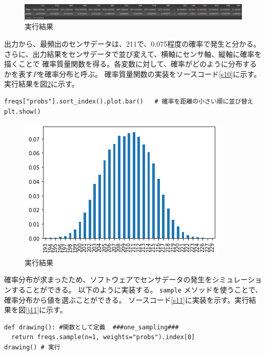 \begin{figure}[htbp]
  \begin{center}
  \includegraphics[width=\linewidth]{img/9.png}
  \caption{実行結果}
  \label{j9}
  \end{center}
\end{figure}

出力から、最頻出のセンサデータは、211で、0.075程度の確率で発生と分かる。
さらに、出力結果をセンサデータで並び変えて、横軸にセンサ軸、縦軸に確率を描くことで
確率質量関数を得る。各変数に対して、確率がどのように分布するかを表す$P$を確率分布と呼ぶ。
確率質量関数の実装をソースコード\ref{s10}\cite{robo}に示す。実行結果を図\ref{j10}に示す。

\begin{lstlisting}[caption=センサデータの並び替え,label=s10]
freqs["probs"].sort_index().plot.bar()   # 確率を距離の小さい順に並び替え
plt.show()
\end{lstlisting}

\begin{figure}[htbp]
  \begin{center}
  \includegraphics[width=.7\linewidth]{img/10.png}
  \caption{実行結果}
  \label{j10}
  \end{center}
\end{figure}

確率分布が求まったため、ソフトウェアでセンサデータの発生をシミュレーションすることができる。
以下のように実装する。
\verb|sample| メソッドを使うことで、確率分布から値を選ぶことができる。
ソースコード\ref{s11}\cite{robo}に実装を示す。実行結果を図\ref{j11}に示す。
\begin{lstlisting}[caption=センサデータのシミュレーション,label=s11]
def drawing(): #関数として定義  ###one_sampling###
  return freqs.sample(n=1, weights="probs").index[0]
drawing() # 実行
\end{lstlisting}

